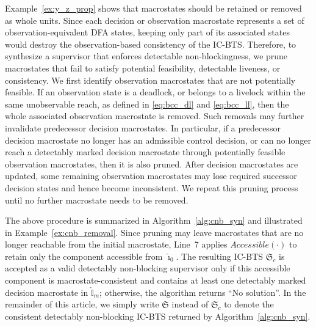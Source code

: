 \documentclass[twocolumn]{autart}
\begin{document}
Example~\ref{ex:y_z_prop} shows that macrostates should be retained or removed as whole units. 
Since each decision or observation macrostate represents a set of observation-equivalent DFA states, keeping only part of its associated states would destroy the observation-based consistency of the IC-BTS. 
Therefore, to synthesize a supervisor that enforces detectable non-blockingness, we prune macrostates that fail to satisfy potential feasibility, detectable liveness, or consistency. 
We first identify observation macrostates that are not potentially feasible.
If an observation state is a deadlock, or belongs to a livelock within the same unobservable reach, as defined in \eqref{eq:bcc_dl} and \eqref{eq:bcc_ll}, then the whole associated observation macrostate is removed. 
Such removals may further invalidate predecessor decision macrostates. 
In particular, if a predecessor decision macrostate no longer has an admissible control decision, or can no longer reach a detectably marked decision macrostate through potentially feasible observation macrostates, then it is also pruned. 
After decision macrostates are updated, some remaining observation macrostates may lose required successor decision states and hence become inconsistent. 
We repeat this pruning process until no further macrostate needs to be removed.

The above procedure is summarized in Algorithm~\ref{alg:cnb_syn} and illustrated in Example~\ref{ex:cnb_removal}. 
Since pruning may leave macrostates that are no longer reachable from the initial macrostate, Line~7 applies $Accessible(\cdot)$ to retain only the component accessible from $\hat{\imath}_0$. 
The resulting IC-BTS $\mathfrak{S}_c$ is accepted as a valid detectably non-blocking supervisor only if this accessible component is macrostate-consistent and contains at least one detectably marked decision macrostate in $\hat{\mathbb{I}}_m$; otherwise, the algorithm returns ``No solution''. 
In the remainder of this article, we simply write $\mathfrak{S}$ instead of $\mathfrak{S}_c$ to denote the consistent detectably non-blocking IC-BTS returned by Algorithm~\ref{alg:cnb_syn}.
\end{document}
